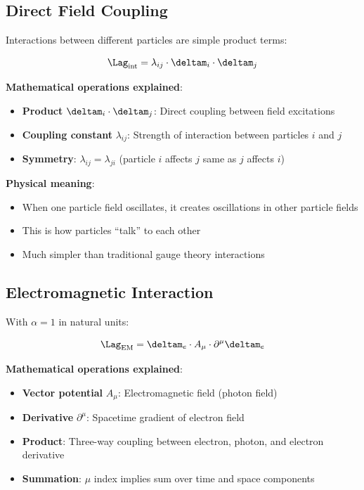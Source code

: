 	\subsection{Direct Field Coupling}
	
	Interactions between different particles are simple product terms:
	
	\begin{equation}
		\Lag_{\text{int}} = \lambda_{ij} \cdot \deltam_i \cdot \deltam_j
		\label{eq:interaction_lagrangian}
	\end{equation}
	
	\textbf{Mathematical operations explained}:
	\begin{itemize}
		\item \textbf{Product} $\deltam_i \cdot \deltam_j$: Direct coupling between field excitations
		\item \textbf{Coupling constant} $\lambda_{ij}$: Strength of interaction between particles $i$ and $j$
		\item \textbf{Symmetry}: $\lambda_{ij} = \lambda_{ji}$ (particle $i$ affects $j$ same as $j$ affects $i$)
	\end{itemize}
	
	\textbf{Physical meaning}:
	\begin{itemize}
		\item When one particle field oscillates, it creates oscillations in other particle fields
		\item This is how particles ``talk'' to each other
		\item Much simpler than traditional gauge theory interactions
	\end{itemize}
	
	\subsection{Electromagnetic Interaction}
	
	With $\alpha = 1$ in natural units:
	
	\begin{equation}
		\Lag_{\text{EM}} = \deltam_e \cdot A_\mu \cdot \partial^\mu \deltam_e
		\label{eq:em_interaction}
	\end{equation}
	
	\textbf{Mathematical operations explained}:
	\begin{itemize}
		\item \textbf{Vector potential} $A_\mu$: Electromagnetic field (photon field)
		\item \textbf{Derivative} $\partial^\mu$: Spacetime gradient of electron field
		\item \textbf{Product}: Three-way coupling between electron, photon, and electron derivative
		\item \textbf{Summation}: $\mu$ index implies sum over time and space components
	\end{itemize}
	
